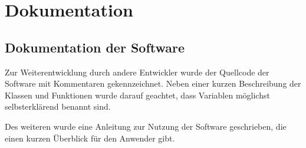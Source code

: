 \section{Dokumentation}
\label{sec:Dokumentation}

\subsection{Dokumentation der Software}
\label{sec:DokumentationSoftware}
Zur Weiterentwicklung durch andere Entwickler wurde der Quellcode der Software mit Kommentaren gekennzeichnet. Neben einer kurzen Beschreibung der Klassen und Funktionen wurde darauf geachtet, dass Variablen möglichst selbsterklärend benannt sind.

Des weiteren wurde eine Anleitung zur Nutzung der Software geschrieben, die einen kurzen Überblick für den Anwender gibt.